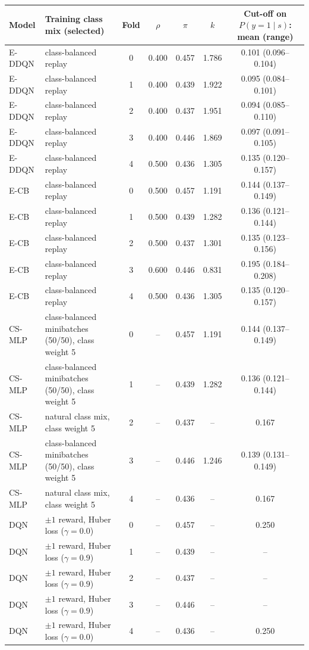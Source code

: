 \begin{tabular}{llccccc}
\toprule
Model & Training class mix (selected) & Fold & $\rho$ & $\pi$ & $k$ & Cut-off on $P(y=1\mid s)$: mean (range) \\
\midrule
E-DDQN & class-balanced replay & 0 & 0.400 & 0.457 & 1.786 & 0.101 (0.096--0.104) \\
E-DDQN & class-balanced replay & 1 & 0.400 & 0.439 & 1.922 & 0.095 (0.084--0.101) \\
E-DDQN & class-balanced replay & 2 & 0.400 & 0.437 & 1.951 & 0.094 (0.085--0.110) \\
E-DDQN & class-balanced replay & 3 & 0.400 & 0.446 & 1.869 & 0.097 (0.091--0.105) \\
E-DDQN & class-balanced replay & 4 & 0.500 & 0.436 & 1.305 & 0.135 (0.120--0.157) \\
\midrule
E-CB & class-balanced replay & 0 & 0.500 & 0.457 & 1.191 & 0.144 (0.137--0.149) \\
E-CB & class-balanced replay & 1 & 0.500 & 0.439 & 1.282 & 0.136 (0.121--0.144) \\
E-CB & class-balanced replay & 2 & 0.500 & 0.437 & 1.301 & 0.135 (0.123--0.156) \\
E-CB & class-balanced replay & 3 & 0.600 & 0.446 & 0.831 & 0.195 (0.184--0.208) \\
E-CB & class-balanced replay & 4 & 0.500 & 0.436 & 1.305 & 0.135 (0.120--0.157) \\
\midrule
CS-MLP & class-balanced minibatches (50/50), class weight 5 & 0 & -- & 0.457 & 1.191 & 0.144 (0.137--0.149) \\
CS-MLP & class-balanced minibatches (50/50), class weight 5 & 1 & -- & 0.439 & 1.282 & 0.136 (0.121--0.144) \\
CS-MLP & natural class mix, class weight 5 & 2 & -- & 0.437 & -- & 0.167 \\
CS-MLP & class-balanced minibatches (50/50), class weight 5 & 3 & -- & 0.446 & 1.246 & 0.139 (0.131--0.149) \\
CS-MLP & natural class mix, class weight 5 & 4 & -- & 0.436 & -- & 0.167 \\
\midrule
DQN & $\pm1$ reward, Huber loss ($\gamma=0.0$) & 0 & -- & 0.457 & -- & 0.250 \\
DQN & $\pm1$ reward, Huber loss ($\gamma=0.9$) & 1 & -- & 0.439 & -- & -- \\
DQN & $\pm1$ reward, Huber loss ($\gamma=0.9$) & 2 & -- & 0.437 & -- & -- \\
DQN & $\pm1$ reward, Huber loss ($\gamma=0.9$) & 3 & -- & 0.446 & -- & -- \\
DQN & $\pm1$ reward, Huber loss ($\gamma=0.0$) & 4 & -- & 0.436 & -- & 0.250 \\
\bottomrule
\end{tabular}
